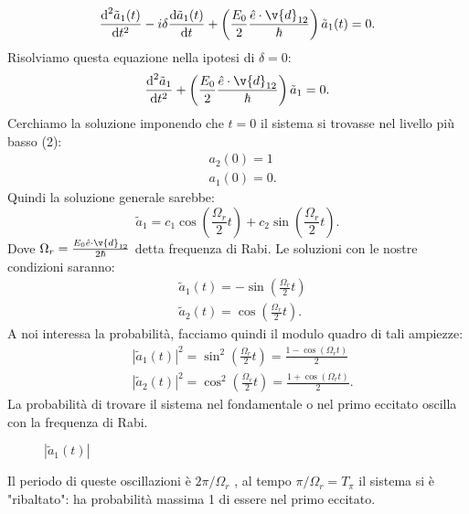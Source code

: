 \[
    \frac{\text{d} ^2\tilde{a}_1(t) }{\text{d} t^2} 
    - i\delta\frac{\text{d} \tilde{a}_1(t) }{\text{d} t}
    + \left(\frac{E_0}{2}\frac{\hat{e}\cdot \v{d}_{12}}{\hbar }\right)
    \tilde{a}_1(t) = 0
.\] 
Risolviamo questa equazione nella ipotesi di $\delta =0$:
\[
    \frac{\text{d}^2 \tilde{a}_1}{\text{d} t^2} 
    + \left(\frac{E_0}{2}\frac{\hat{e}\cdot \v{d}_{12}}{\hbar }\right)
    \tilde{a}_1=0
.\] 
Cerchiamo la soluzione imponendo che $t=0$ il sistema si trovasse nel livello più basso (2): 
\[\begin{aligned}
    &a_2(0) = 1\\
    &a_1(0) = 0
.\end{aligned}\]
Quindi la soluzione generale sarebbe:
\[
    \tilde{a}_1 = c_1 \cos\left(\frac{\Omega_r}{2}t\right) 
    + c_2 \sin\left(\frac{\Omega_r}{2}t\right)
.\] 
Dove $\Omega_r = \frac{E_0 \hat{e}\cdot \v{d}_{12}}{2\hbar }$  detta frequenza di Rabi. Le soluzioni con le nostre condizioni saranno:
\[\begin{aligned}
    &\tilde{a}_1(t) = -\sin\left(\frac{\Omega_r}{2}t\right)\\
    &\tilde{a}_2(t) = \cos\left(\frac{\Omega_r}{2}t\right)
.\end{aligned}\]
A noi interessa la probabilità, facciamo quindi il modulo quadro di tali ampiezze:
\[\begin{aligned}
    &\left|\tilde{a}_1(t)\right|^2 = \sin^2\left(\frac{\Omega_r}{2}t\right)=
    \frac{1-\cos\left(\Omega_r t\right)}{2}\\
    &\left|\tilde{a}_2(t)\right|^2 = \cos^2\left(\frac{\Omega_r}{2}t\right)=
    \frac{1+\cos\left(\Omega_rt\right)}{2}
.\end{aligned}\]
La probabilità di trovare il sistema nel fondamentale o nel primo eccitato oscilla con la frequenza di Rabi. 
\begin{figure}[H]
    \centering
    \caption{$\left|\tilde{a}_1(t) \right|$ }
    \label{ddd}
\end{figure}
Il periodo di queste oscillazioni è $2\pi /\Omega_r$ , al tempo $\pi /\Omega_r = T_\pi$ il sistema si è "ribaltato": ha probabilità massima 1 di essere nel primo eccitato.
